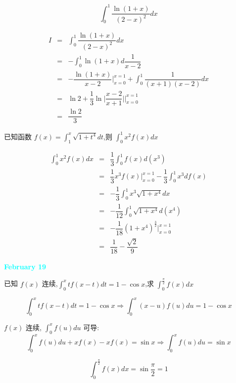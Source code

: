 \begin{example}[][Exam: 28.3.6]
	$$\int_{0}^{1}\dfrac{\ln(1+x)}{(2-x)^{2}}dx$$
\end{example}
\begin{solution}
	\begin{eqnarray*}
		I & = & \int_{0}^{1}\dfrac{\ln(1+x)}{(2-x)^{2}}dx\\
		  & = & -\int_{0}^{1}\ln(1+x)d \dfrac{1}{x-2}\\
		  & = & -\dfrac{\ln(1+x)}{x-2}\big|_{x=0}^{x=1} + \int_{0}^{1}\dfrac{1}{(x+1)(x-2)}dx\\
		  & = & \ln 2 + \dfrac{1}{3}\ln\big|\dfrac{x-2}{x+1}\big|\big|_{x=0}^{x=1}\\
		  & = & \dfrac{\ln 2}{3}
	\end{eqnarray*}
\end{solution}
\begin{example}[][Exam: 28.3.7]
	已知函数 $f(x)=\int_{1}^{x}\sqrt{1+t^{4}}dt$,则 $\int_{0}^{1}x^{2}f(x)dx$
\end{example}
\begin{solution}
	\begin{eqnarray*}
		\int_{0}^{1}x^{2}f(x)dx & = & \dfrac{1}{3}\int_{0}^{1}f(x)d(x^{3})\\
		& = & \dfrac{1}{3}x^{3}f(x)\big|_{x=0}^{x=1} - \dfrac{1}{3}\int_{0}^{1}x^{3}df(x)\\
		& = & -\dfrac{1}{3}\int_{0}^{1}x^{3}\sqrt{1+x^{4}}dx\\
		& = & -\dfrac{1}{12}\int_{0}^{1}\sqrt{1+x^{4}}d(x^{4})\\
		& = & -\dfrac{1}{18}(1+x^{4})^{\frac{3}{2}}\big|_{x=0}^{x=1}\\
		& = & \dfrac{1}{18}-\dfrac{\sqrt{2}}{9} 
	\end{eqnarray*}
\end{solution}

\textcolor{cyan}{\textbf{February 19}}

\begin{example}[][Exam: 28.3.8]
	已知 $f(x)$ 连续,$\int_{0}^{x}tf(x-t)dt=1-\cos x$,求 $\int_{0}^{\frac{\pi}{2}}f(x)dx$
\end{example}
\begin{solution}
	$$\int_{0}^{x}tf(x-t)dt = 1 - \cos x\Rightarrow \int_{0}^{x}(x-u)f(u)du = 1 - \cos x$$

	$f(x)$ 连续, $\int_{0}^{x}f(u)du$ 可导:
	$$\int_{0}^{x}f(u)du + xf(x) - xf(x) = \sin x\Rightarrow \int_{0}^{x}f(u)du = \sin x$$

	$$\int_{0}^{\frac{\pi}{2}}f(x)dx = \sin \dfrac{\pi}{2} = 1$$

\end{solution}

